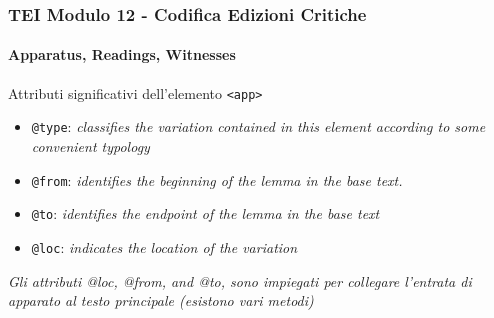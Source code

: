 \begin{frame}
    \frametitle{TEI Modulo 12 - Codifica Edizioni Critiche}
    \framesubtitle{Apparatus, Readings, Witnesses}
    \addtocounter{nframe}{1}












    \begin{block}{Attributi significativi dell'elemento \texttt{<app>}}
        \begin{itemize}
            \item \texttt{@type}: \textit{classifies the variation contained in this element according to some convenient typology}
            \item \texttt{@from}: \textit{identifies the beginning of the lemma in the base text.}
            \item \texttt{@to}: \textit{identifies the endpoint of the lemma in the base text}
            \item \texttt{@loc}: \textit{indicates the location of the variation}
        \end{itemize}
    \end{block}

    \textit{Gli attributi @loc, @from, and @to, sono impiegati per collegare l'entrata di apparato al testo principale (esistono vari metodi)}


\end{frame}

